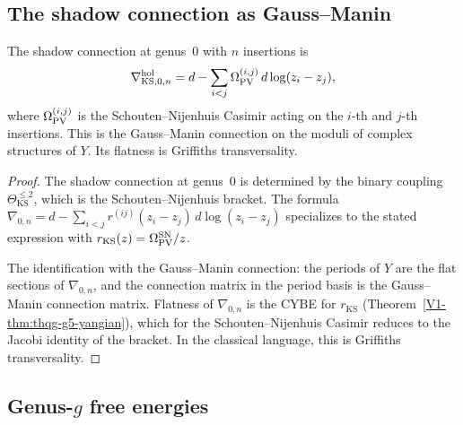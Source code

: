 \subsection{The shadow connection as Gauss--Manin}

\begin{theorem}[Shadow connection = Gauss--Manin; \ClaimStatusProvedHere]
The shadow connection at genus~$0$ with $n$ insertions is
\begin{equation}%
\nabla^{\mathrm{hol}}_{\mathrm{KS},0,n}
= d - \sum_{i < j}
\Omega_{\PV}^{(i,j)}\, d\log(z_i - z_j),
\end{equation}
where $\Omega_{\operatorname{PV}}^{(i,j)}$ is the Schouten--Nijenhuis Casimir
acting on the $i$-th and $j$-th insertions. This is the
Gauss--Manin connection on the moduli of complex structures of $Y$.
Its flatness is Griffiths transversality.
\end{theorem}

\begin{proof}
The shadow connection at genus~$0$ is determined by the binary
coupling $\Theta_{\mathrm{KS}}^{\le 2}$, which is the
Schouten--Nijenhuis bracket. The formula
$\nabla_{0,n} = d - \sum_{i<j} r^{(ij)}(z_i - z_j)\,d\log(z_i - z_j)$
specializes to the stated expression with $r_{\mathrm{KS}}(z)
= \Omega_{\operatorname{PV}}^{\mathrm{SN}}/z$.

The identification with the Gauss--Manin connection:
the periods of $Y$ are the flat sections of $\nabla_{0,n}$, and the
connection matrix in the period basis is the Gauss--Manin connection
matrix. Flatness of $\nabla_{0,n}$ is the CYBE for $r_{\mathrm{KS}}$
(Theorem~\ref*{V1-thm:thqg-g5-yangian}), which for the Schouten--Nijenhuis
Casimir reduces to the Jacobi identity of the bracket. In the
classical language, this is Griffiths transversality.
\end{proof}


\subsection{Genus-$g$ free energies}

